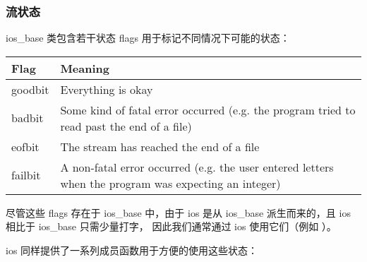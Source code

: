 \documentclass[../../LearnCpp.tex]{subfiles}
\begin{document}

\subsubsection*{流状态}

ios\_base 类包含若干状态 flags 用于标记不同情况下可能的状态：

\begin{center}
  \begin{tiny}
    \begin{tabularx}{ 1\textwidth}{
        | >{\raggedright\arraybackslash}X
        | >{\raggedright\arraybackslash}X |
      }
      \hline
      Flag    & Meaning                                                                                              \\
      \hline
      goodbit & Everything is okay                                                                                   \\
      badbit  & Some kind of fatal error occurred (e.g. the program tried to read past the end of a file)            \\
      eofbit  & The stream has reached the end of a file                                                             \\
      failbit & A non-fatal error occurred (e.g. the user entered letters when the program was expecting an integer) \\
      \hline
    \end{tabularx}
  \end{tiny}
\end{center}

尽管这些 flags 存在于 ios\_base 中，由于 ios 是从 ios\_base 派生而来的，且 ios 相比于 ios\_base 只需少量打字，
因此我们通常通过 ios 使用它们（例如 ）。

ios 同样提供了一系列成员函数用于方便的使用这些状态：
\end{document}
